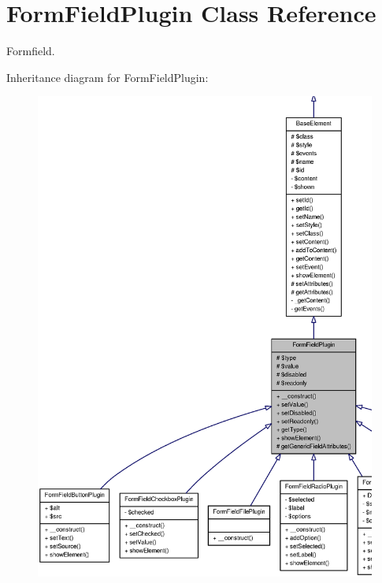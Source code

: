 \section{FormFieldPlugin Class Reference}
\label{classFormFieldPlugin}


Formfield.  




Inheritance diagram for FormFieldPlugin:\nopagebreak
\begin{figure}[H]
\begin{center}
\leavevmode
\includegraphics[width=400pt]{classFormFieldPlugin__inherit__graph}
\end{center}
\end{figure}


